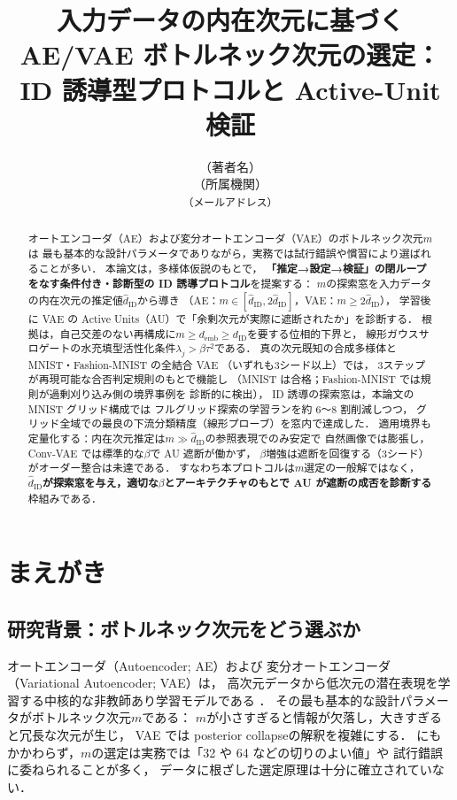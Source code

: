 \documentclass[11pt,a4paper]{jsarticle}
\title{入力データの内在次元に基づく AE/VAE ボトルネック次元の選定：\\
ID 誘導型プロトコルと Active-Unit 検証}
\author{（著者名）\\
{\small （所属機関）}\\
{\small \texttt{（メールアドレス）}}}
\date{}
\newcommand{\dID}{d_{\mathrm{ID}}}
\newcommand{\hatdID}{\hat{d}_{\mathrm{ID}}}
\newcommand{\demb}{d_{\mathrm{emb}}}
\begin{document}
\maketitle

\begin{abstract}
オートエンコーダ（AE）および変分オートエンコーダ（VAE）のボトルネック次元$m$は
最も基本的な設計パラメータでありながら，実務では試行錯誤や慣習により選ばれることが多い．
本論文は，多様体仮説のもとで，
\textbf{「推定→設定→検証」の閉ループをなす条件付き・診断型の
ID 誘導プロトコル}を提案する：
$m$の探索窓を入力データの内在次元の推定値$\hatdID$から導き
（AE：$m \in [\hatdID, 2\hatdID]$，VAE：$m \geq 2\hatdID$），
学習後に VAE の Active Units（AU）で「余剰次元が実際に遮断されたか」を診断する．
根拠は，自己交差のない再構成に$m \geq \demb \geq \dID$を要する位相的下界と，
線形ガウスサロゲートの水充填型活性化条件$\lambda_j > \beta\tau^2$である．
真の次元既知の合成多様体と MNIST・Fashion-MNIST の全結合 VAE
（いずれも3シード以上）では，
3ステップが再現可能な合否判定規則のもとで機能し
（MNIST は合格；Fashion-MNIST では規則が過剰刈り込み側の境界事例を
診断的に検出），
ID 誘導の探索窓は，本論文の MNIST グリッド構成では
フルグリッド探索の学習ランを約 6〜8 割削減しつつ，
グリッド全域での最良の下流分類精度（線形プローブ）を窓内で達成した．
適用境界も定量化する：内在次元推定は$m \gg \hatdID$の参照表現でのみ安定で
自然画像では膨張し，Conv-VAE では標準的な$\beta$で AU 遮断が働かず，
$\beta$増強は遮断を回復する（3シード）がオーダー整合は未達である．
すなわち本プロトコルは$m$選定の一般解ではなく，
\textbf{$\hatdID$が探索窓を与え，適切な$\beta$とアーキテクチャのもとで
AU が遮断の成否を診断する}枠組みである．
\end{abstract}

\section{まえがき}\label{sec:intro}

\subsection{研究背景：ボトルネック次元をどう選ぶか}\label{sec:intro_bg}

オートエンコーダ（Autoencoder; AE）および
変分オートエンコーダ（Variational Autoencoder; VAE）\cite{kingma2014vae}は，
高次元データから低次元の潜在表現を学習する中核的な非教師あり学習モデルである
\cite{bengio2013representation}．
その最も基本的な設計パラメータがボトルネック次元$m$である：
$m$が小さすぎると情報が欠落し，大きすぎると冗長な次元が生じ，
VAE では posterior collapse\cite{lucas2019elbo}の解釈を複雑にする．
にもかかわらず，$m$の選定は実務では「32 や 64 などの切りのよい値」や
試行錯誤に委ねられることが多く，
データに根ざした選定原理は十分に確立されていない．
\end{document}
